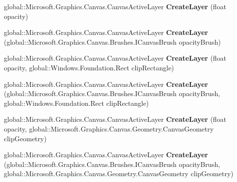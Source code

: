 \begin{DoxyCompactItemize}
global\+::\+Microsoft.\+Graphics.\+Canvas.\+Canvas\+Active\+Layer {\bfseries Create\+Layer} (float opacity)
\item 
\mbox{\label{class_microsoft_1_1_graphics_1_1_canvas_1_1_canvas_drawing_session_a5e5f209e443e8e7be3fe82510d320872}} 
global\+::\+Microsoft.\+Graphics.\+Canvas.\+Canvas\+Active\+Layer {\bfseries Create\+Layer} (global\+::\+Microsoft.\+Graphics.\+Canvas.\+Brushes.\+I\+Canvas\+Brush opacity\+Brush)
\item 
\mbox{\label{class_microsoft_1_1_graphics_1_1_canvas_1_1_canvas_drawing_session_ae49a5c754d55c9c011190ba2f3b78a48}} 
global\+::\+Microsoft.\+Graphics.\+Canvas.\+Canvas\+Active\+Layer {\bfseries Create\+Layer} (float opacity, global\+::\+Windows.\+Foundation.\+Rect clip\+Rectangle)
\item 
\mbox{\label{class_microsoft_1_1_graphics_1_1_canvas_1_1_canvas_drawing_session_a4b53f77bb1b1fec2b77053ee210876d1}} 
global\+::\+Microsoft.\+Graphics.\+Canvas.\+Canvas\+Active\+Layer {\bfseries Create\+Layer} (global\+::\+Microsoft.\+Graphics.\+Canvas.\+Brushes.\+I\+Canvas\+Brush opacity\+Brush, global\+::\+Windows.\+Foundation.\+Rect clip\+Rectangle)
\item 
\mbox{\label{class_microsoft_1_1_graphics_1_1_canvas_1_1_canvas_drawing_session_a42690fb34cb40ed3182a4915a425c536}} 
global\+::\+Microsoft.\+Graphics.\+Canvas.\+Canvas\+Active\+Layer {\bfseries Create\+Layer} (float opacity, global\+::\+Microsoft.\+Graphics.\+Canvas.\+Geometry.\+Canvas\+Geometry clip\+Geometry)
\item 
\mbox{\label{class_microsoft_1_1_graphics_1_1_canvas_1_1_canvas_drawing_session_aec4cd7b8de61e6dff683f423ccfd6416}} 
global\+::\+Microsoft.\+Graphics.\+Canvas.\+Canvas\+Active\+Layer {\bfseries Create\+Layer} (global\+::\+Microsoft.\+Graphics.\+Canvas.\+Brushes.\+I\+Canvas\+Brush opacity\+Brush, global\+::\+Microsoft.\+Graphics.\+Canvas.\+Geometry.\+Canvas\+Geometry clip\+Geometry)
\item 
\mbox{\label{class_microsoft_1_1_graphics_1_1_canvas_1_1_canvas_drawing_session_aad550ec89902ec08b4795f1dde974974}} 

\end{DoxyCompactItemize}
